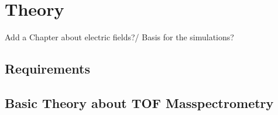 \section{Theory}
	Add a Chapter about electric fields?/ Basis for the simulations?
	\subsection{Requirements}
	
	\subsection{Basic Theory about TOF Masspectrometry} %
	
